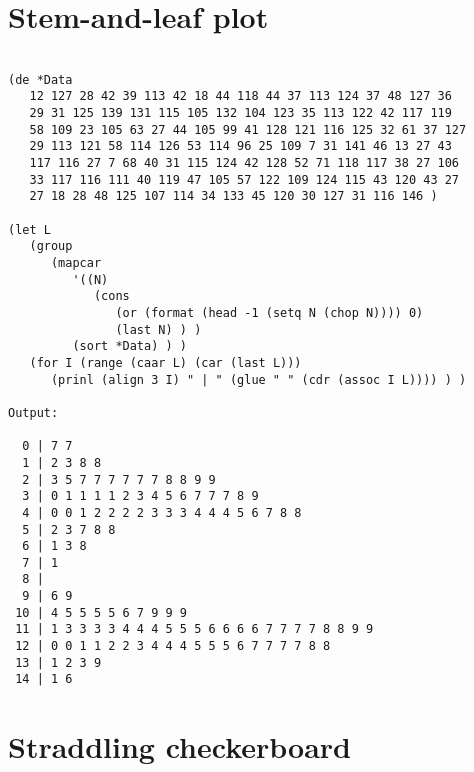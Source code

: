 \section*{Stem-and-leaf plot}

\begin{verbatim}

(de *Data
   12 127 28 42 39 113 42 18 44 118 44 37 113 124 37 48 127 36
   29 31 125 139 131 115 105 132 104 123 35 113 122 42 117 119
   58 109 23 105 63 27 44 105 99 41 128 121 116 125 32 61 37 127
   29 113 121 58 114 126 53 114 96 25 109 7 31 141 46 13 27 43
   117 116 27 7 68 40 31 115 124 42 128 52 71 118 117 38 27 106
   33 117 116 111 40 119 47 105 57 122 109 124 115 43 120 43 27
   27 18 28 48 125 107 114 34 133 45 120 30 127 31 116 146 )

(let L
   (group
      (mapcar
         '((N)
            (cons
               (or (format (head -1 (setq N (chop N)))) 0)
               (last N) ) )
         (sort *Data) ) )
   (for I (range (caar L) (car (last L)))
      (prinl (align 3 I) " | " (glue " " (cdr (assoc I L)))) ) )

Output:

  0 | 7 7
  1 | 2 3 8 8
  2 | 3 5 7 7 7 7 7 7 8 8 9 9
  3 | 0 1 1 1 1 2 3 4 5 6 7 7 7 8 9
  4 | 0 0 1 2 2 2 2 3 3 3 4 4 4 5 6 7 8 8
  5 | 2 3 7 8 8
  6 | 1 3 8
  7 | 1
  8 |
  9 | 6 9
 10 | 4 5 5 5 5 6 7 9 9 9
 11 | 1 3 3 3 3 4 4 4 5 5 5 6 6 6 6 7 7 7 7 8 8 9 9
 12 | 0 0 1 1 2 2 3 4 4 4 5 5 5 6 7 7 7 7 8 8
 13 | 1 2 3 9
 14 | 1 6

\end{verbatim}

\section*{Straddling checkerboard}

